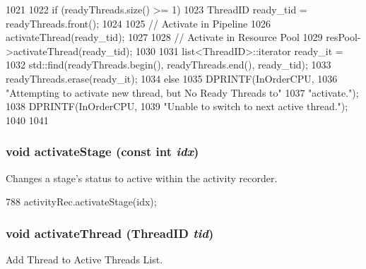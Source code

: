 \begin{DoxyCode}
1021 {
1022     if (readyThreads.size() >= 1) {          
1023         ThreadID ready_tid = readyThreads.front();
1024         
1025         // Activate in Pipeline
1026         activateThread(ready_tid);                        
1027         
1028         // Activate in Resource Pool
1029         resPool->activateThread(ready_tid);
1030         
1031         list<ThreadID>::iterator ready_it =
1032             std::find(readyThreads.begin(), readyThreads.end(), ready_tid);
1033         readyThreads.erase(ready_it);                        
1034     } else {
1035         DPRINTF(InOrderCPU,
1036                 "Attempting to activate new thread, but No Ready Threads to"
1037                 "activate.\n");
1038         DPRINTF(InOrderCPU,
1039                 "Unable to switch to next active thread.\n");
1040     }        
1041 }
\end{DoxyCode}
\hypertarget{classInOrderCPU_a9039dad8d295c41b50eba0342e6c11c0}{
\subsubsection[{activateStage}]{\setlength{\rightskip}{0pt plus 5cm}void activateStage (const int {\em idx})}}
\label{classInOrderCPU_a9039dad8d295c41b50eba0342e6c11c0}
Changes a stage's status to active within the activity recorder. 


\begin{DoxyCode}
788     { activityRec.activateStage(idx); }
\end{DoxyCode}
\hypertarget{classInOrderCPU_a687aa4600423bb30ecf3bb1da6cd6000}{
\subsubsection[{activateThread}]{\setlength{\rightskip}{0pt plus 5cm}void activateThread ({\bf ThreadID} {\em tid})}}
\label{classInOrderCPU_a687aa4600423bb30ecf3bb1da6cd6000}
Add Thread to Active Threads List. 


